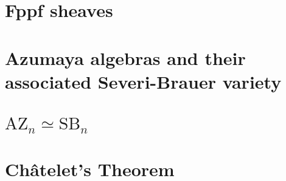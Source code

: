 \documentclass{../util/zariski}
\newcommand{\SB}{\mathrm{SB}}
\newcommand{\AZ}{\mathrm{AZ}}
\begin{document}
\tableofcontents

\section{Fppf sheaves}


\section{Azumaya algebras and their associated Severi-Brauer variety}


\section{$\AZ_n\simeq \SB_n$}


\section{Ch\^atelet's Theorem}


\printindex

\printbibliography
\end{document}
